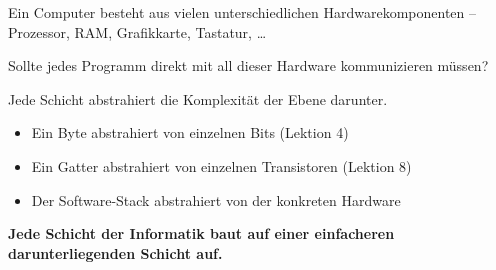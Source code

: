 \renewcommand{\thelektion}{L12 \textperiodcentered{} Betriebssystem \& Software-Schichten}

\begin{frame}\end{frame}

\begin{frame}
\begin{center}
Ein Computer besteht aus vielen unterschiedlichen Hardwarekomponenten -- Prozessor, RAM, Grafikkarte, Tastatur, \ldots
\vspace{4mm}

Sollte jedes Programm direkt mit all dieser Hardware kommunizieren müssen?
\end{center}
\end{frame}

\begin{frame}
\begin{center}

\end{center}
\begin{center}Jede Schicht abstrahiert die Komplexität der Ebene darunter.\end{center}
\end{frame}

\begin{frame}
\begin{itemize}[<+->]\setlength\itemsep{6pt}
  \item Ein Byte abstrahiert von einzelnen Bits (Lektion 4)
  \item Ein Gatter abstrahiert von einzelnen Transistoren (Lektion 8)
  \item Der Software-Stack abstrahiert von der konkreten Hardware
\end{itemize}
\vspace{3mm}
\begin{center}\color{FDUteal}\bfseries Jede Schicht der Informatik baut auf einer einfacheren darunterliegenden Schicht auf.\end{center}
\end{frame}

